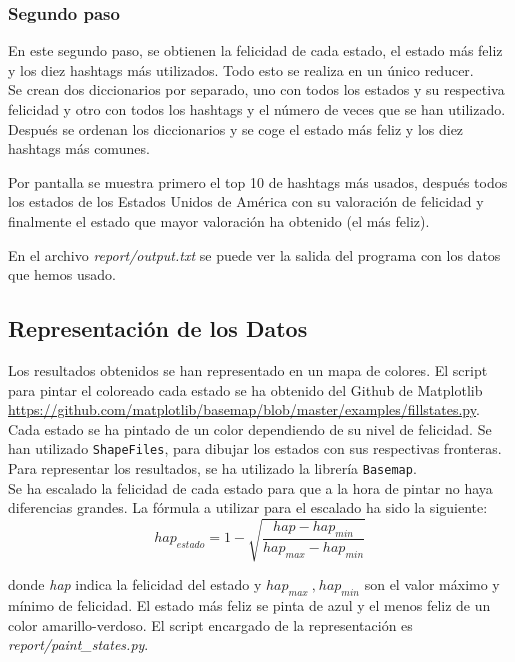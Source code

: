\documentclass[12pt,a4paper]{article}
\begin{document}
\begin{itemize}
\subsubsection{Segundo paso}

En este segundo paso, se obtienen  la felicidad de cada estado, el estado más feliz y los diez hashtags más utilizados. Todo esto se realiza en un único reducer.\\

Se crean dos diccionarios por separado, uno con todos los estados y su respectiva felicidad y otro con todos los hashtags y el número de veces que se han utilizado. Después se ordenan los diccionarios y se coge el estado más feliz y los diez hashtags más comunes.

Por pantalla se muestra primero el top 10 de hashtags más usados, después todos los estados de los Estados Unidos de América con su valoración de felicidad y finalmente el estado que mayor valoración ha obtenido (el más feliz).

En el archivo \textit{report/output.txt} se puede ver la salida del programa con los datos que hemos usado.
\end{itemize}

\subsection{Representación de los Datos}
Los resultados obtenidos se han representado en un mapa de colores. El script para pintar el coloreado cada estado se ha obtenido del Github de Matplotlib 	\url{https://github.com/matplotlib/basemap/blob/master/examples/fillstates.py}.\\
Cada estado se ha pintado de un color dependiendo de su nivel de felicidad. Se han utilizado \texttt{ShapeFiles}, para dibujar los estados con sus respectivas fronteras. Para representar los resultados, se ha utilizado la librería \texttt{Basemap}.\\

Se ha escalado la felicidad de cada estado para que a la hora de pintar no haya diferencias grandes. La fórmula a utilizar para el escalado ha sido la siguiente:
$$hap_{estado}=1-\displaystyle \sqrt{\dfrac{hap-hap_{min}}{hap_{max}-hap_{min}}}$$

donde \textit{hap} indica la felicidad del estado y $hap_{max}\ \text{,}\ hap_{min}$ son el valor máximo y mínimo de felicidad.
El estado más feliz se pinta de azul y el menos feliz de un color amarillo-verdoso. El script encargado de la representación es \textit{report/paint\_states.py}. 
\end{document}

